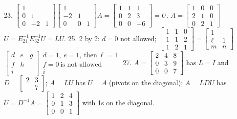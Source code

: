 23. \(\begin{bmatrix}1\\ 0&1\\ 0&-2&1\end{bmatrix}\)\(\begin{bmatrix}1\\ -2&1\\ 0&0&1\end{bmatrix}\)\(A=\begin{bmatrix}1&1&1\\ 0&2&3\\ 0&0&-6\end{bmatrix}\)\(=U\). \(A=\begin{bmatrix}1&0&0\\ 2&1&0\\ 0&2&1\end{bmatrix}\)\(U=E_{21}^{-1}E_{32}^{-1}U=LU\).
25. 2 by 2: \(d=0\) not allowed; \(\begin{bmatrix}1&1&0\\ 1&1&2\\ 1&2&1\end{bmatrix}=\begin{bmatrix}1\\ \ell&1\\ m&n\end{bmatrix}\)\(\begin{bmatrix}d&e&g\\ f&h\\ i\end{bmatrix}\)\(\begin{array}{c}d=1,\ e=1,\ \text{then}\ \ell=1\\ f=0\ \text{is not allowed}\\ i\end{array}\)
27. \(A=\begin{bmatrix}2&4&8\\ 0&3&9\\ 0&0&7\end{bmatrix}\) has \(L=I\) and \(D=\begin{bmatrix}2&3\\ &7\end{bmatrix}\); \(A=LU\) has \(U=A\) (pivots on the diagonal); \(A=LDU\) has \(U=D^{-1}A=\begin{bmatrix}1&2&4\\ 0&1&3\\ 0&0&1\end{bmatrix}\) with 1s on the diagonal.

 